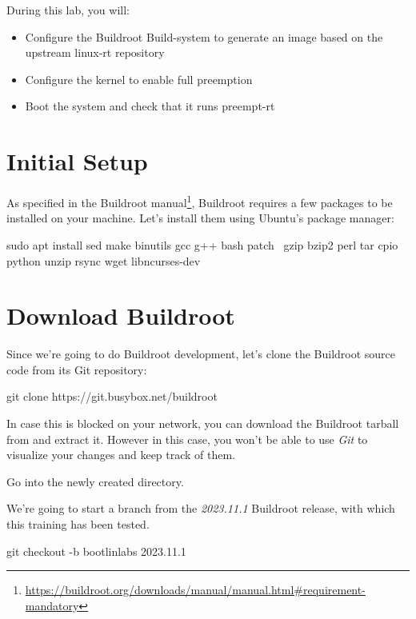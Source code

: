 
During this lab, you will:
\begin{itemize}
        \item Configure the Buildroot Build-system to generate an image based on the upstream linux-rt repository
        \item Configure the kernel to enable full preemption
        \item Boot the system and check that it runs preempt-rt
\end{itemize}

\section{Initial Setup}
As specified in the Buildroot
manual\footnote{\url{https://buildroot.org/downloads/manual/manual.html\#requirement-mandatory}},
Buildroot requires a few packages to be installed on your
machine. Let's install them using Ubuntu's package manager:

\begin{bashinput}
sudo apt install sed make binutils gcc g++ bash patch \
  gzip bzip2 perl tar cpio python unzip rsync wget libncurses-dev
\end{bashinput}

\section{Download Buildroot}

Since we're going to do Buildroot development, let's clone the
Buildroot source code from its Git repository:

\begin{bashinput}
git clone https://git.busybox.net/buildroot
\end{bashinput}

In case this is blocked on your network, you can download the Buildroot
tarball \code{buildroot-2023.11.1.tar.bz2} from
 and extract it. However in this
case, you won't be able to use {\em Git} to visualize your changes and
keep track of them.

Go into the newly created  directory.

We're going to start a branch from the {\em 2023.11.1} Buildroot
release, with which this training has been tested.

\begin{bashinput}
git checkout -b bootlinlabs 2023.11.1
\end{bashinput}

